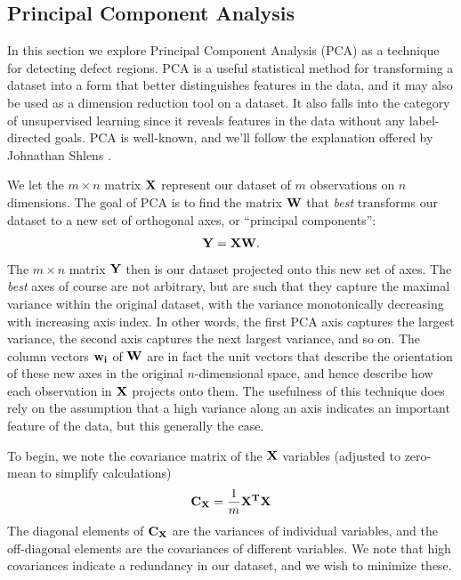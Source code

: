 \subsection{Principal Component Analysis}
In this section we explore Principal Component Analysis (PCA) as a technique for detecting defect regions. PCA is a useful statistical method for transforming a dataset into a form that better distinguishes features in the data, and it may also be used as a dimension reduction tool on a dataset. It also falls into the category of unsupervised learning since it reveals features in the data without any label-directed goals. PCA is well-known, and we'll follow the explanation offered by Johnathan Shlens \cite{shlens2014pca}.

We let the $m\times n$ matrix $\mathbf{X}$ represent our dataset of $m$ observations on $n$ dimensions. The goal of PCA is to find the matrix $\mathbf{W}$ that \textit{best} transforms our dataset to a new set of orthogonal axes, or ``principal components'':
\begin{align*}
	\mathbf{Y} = \mathbf{X}\mathbf{W}.
\end{align*}
The $m\times n$ matrix $\mathbf{Y}$ then is our dataset projected onto this new set of axes. The \textit{best} axes of course are not arbitrary, but are such that they capture the maximal variance within the original dataset, with the variance monotonically decreasing with increasing axis index. In other words, the first PCA axis captures the largest variance, the second axis captures the next largest variance, and so on.
The column vectors $\mathbf{w_i}$ of $\mathbf{W}$ are in fact the unit vectors that describe the orientation of these new axes in the original $n$-dimensional space, and hence describe how each observation in $\mathbf{X}$ projects onto them.
The usefulness of this technique does rely on the assumption that a high variance along an axis indicates an important feature of the data, but this generally the case.

To begin, we note the covariance matrix of the $\mathbf{X}$ variables (adjusted to zero-mean to simplify calculations)
\begin{align*}
	\mathbf{C_X} = \frac{1}{m}\mathbf{X^TX}
\end{align*}
The diagonal elements of $\mathbf{C_X}$ are the variances of individual variables, and the off-diagonal elements are the covariances of different variables. We note that high covariances indicate a redundancy in our dataset, and we wish to minimize these.

